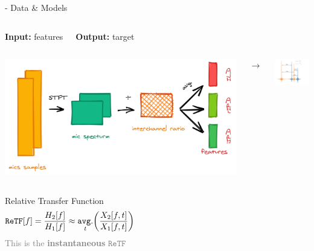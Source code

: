 
\begin{frame}{\lantern - Data \& Models}

    \vspace{-3mm}
    \begin{block}{}
        \begin{columns}[onlytextwidth]
            \centering
            \textbf{Input:} features


            \centering
            \textbf{Output:} target
        \end{columns}

        \pause
        \begin{columns}[onlytextwidth]
            \centering
            \includegraphics[width=\textwidth]{figures/lantern.png}

            $\longrightarrow$

            \centering
            \includegraphics[width=40mm]{figures/rirs4.pdf}
        \end{columns}

        \begin{columns}[T,onlytextwidth]
            \centering
            Relative Transfer Function
            \begin{equation*}
                    \mathtt{ReTF}[f] = \frac{H_2[f]}{H_1[f]} \approx \timeavg \kparen{\frac{X_2[f,t]}{X_1[f,t]}}
            \end{equation*}
            \textcolor{gray}{\small This is the \textbf{instantaneous} $\mathtt{ReTF}$}


\end{columns}
\end{block}
\end{frame}
